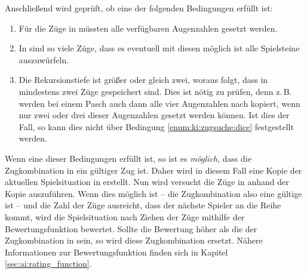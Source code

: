 Anschließend wird geprüft, ob eine der folgenden Bedingungen erfüllt ist:
\begin{enumerate}
  \item \label{enum:ki:zugsuche:dice} Für die Züge in  müssten alle verfügbaren Augenzahlen gesetzt werden.
  \item In  sind so viele Züge, dass es eventuell mit diesen möglich ist alle Spielsteine auszuwürfeln.
  \item Die Rekursionstiefe ist größer oder gleich zwei, woraus folgt, dass in  mindestens zwei Züge gespeichert sind. Dies ist nötig zu prüfen, denn z.\,B. werden bei einem Pasch auch dann alle vier Augenzahlen nach  kopiert, wenn nur zwei oder drei dieser Augenzahlen gesetzt werden können. Ist dies der Fall, so kann dies nicht über Bedingung \ref{enum:ki:zugsuche:dice} festgestellt werden.
\end{enumerate}
Wenn eine dieser Bedingungen erfüllt ist, so ist es \emph{möglich}, dass die Zugkombination in  ein gültiger Zug ist. Daher wird in diesem Fall eine Kopie der aktuellen Spielsituation in  erstellt. Nun wird versucht die Züge in  anhand der Kopie auszuführen. Wenn dies möglich ist -- die Zugkombination also eine gültige ist -- und die Zahl der Züge ausreicht, dass der nächste Spieler an die Reihe kommt, wird die Spielsituation nach Ziehen der Züge mithilfe der Bewertungsfunktion  bewertet. Sollte die Bewertung höher als die der Zugkombination in  sein, so wird diese Zugkombination ersetzt. Nähere Informationen zur Bewertungsfunktion finden sich in Kapitel \ref{sec:ai:rating_function}.

